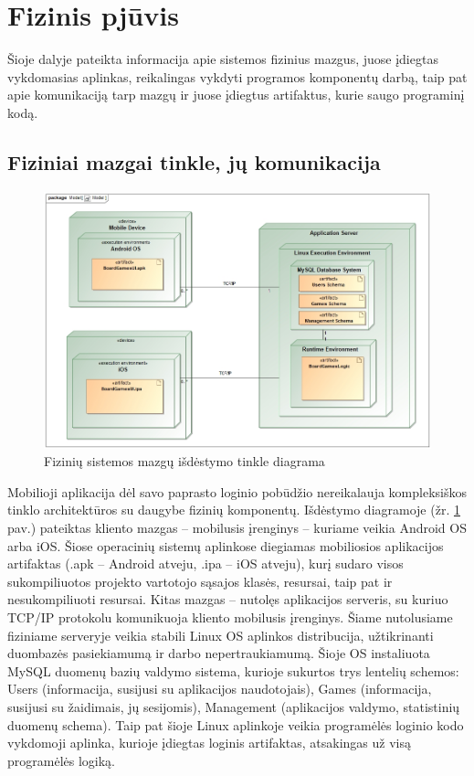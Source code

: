 \documentclass{VUMIFPSkursinis}
\begin{document}
\section{Fizinis pjūvis}
Šioje dalyje pateikta informacija apie sistemos fizinius mazgus, juose įdiegtas vykdomasias aplinkas, reikalingas vykdyti programos komponentų darbą, taip pat apie komunikaciją tarp mazgų ir juose įdiegtus artifaktus, kurie saugo programinį kodą.
	\subsection{Fiziniai mazgai tinkle, jų komunikacija}
				\begin{figure}[H]
				\centering
				\includegraphics[scale=0.5]{img/NodesCommunication}
				\caption{Fizinių sistemos mazgų išdėstymo tinkle diagrama}
				\label{img:NodesCommunication}
			\end{figure}
			Mobilioji aplikacija dėl savo paprasto loginio pobūdžio nereikalauja 				kompleksiškos tinklo architektūros su daugybe fizinių komponentų. 				Išdėstymo diagramoje (žr. \ref{img:NodesCommunication} pav.)  pateiktas kliento mazgas – mobilusis įrenginys – 				kuriame veikia Android OS arba iOS. Šiose operacinių sistemų aplinkose 				diegiamas mobiliosios aplikacijos artifaktas (.apk – Android atveju, .ipa 				– iOS atveju), kurį sudaro visos sukompiliuotos projekto vartotojo sąsajos 				klasės, resursai, taip pat ir nesukompiliuoti resursai. Kitas mazgas – 				nutolęs aplikacijos serveris, su kuriuo TCP/IP protokolu komunikuoja kliento mobilusis įrenginys. Šiame nutolusiame fiziniame serveryje veikia stabili Linux OS 				aplinkos distribucija, užtikrinanti duombazės pasiekiamumą ir darbo 				nepertraukiamumą. Šioje OS instaliuota MySQL duomenų bazių valdymo 				sistema, kurioje sukurtos trys lentelių schemos: Users (informacija, 				susijusi su aplikacijos naudotojais), Games (informacija, susijusi su 				žaidimais, jų sesijomis), Management (aplikacijos valdymo, statistinių 				duomenų schema). Taip pat šioje Linux aplinkoje veikia programėlės loginio 				kodo vykdomoji aplinka, kurioje įdiegtas loginis artifaktas, atsakingas už 				visą programėlės logiką.
\end{document}
